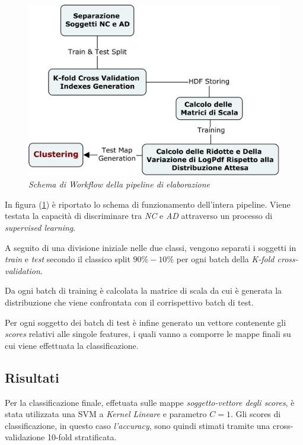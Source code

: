 \documentclass[12pt,openright,a4paper]{article}
\begin{document}
\begin{figure}[!h]
\centering
\includegraphics[scale=0.18]{ADNI-alg}
\caption{\textit{Schema di Workflow della pipeline di elaborazione}}
\label{ADNI-alg}
\end{figure}

In figura (\ref{ADNI-alg}) è riportato lo schema di funzionamento dell'intera pipeline. Viene testata la capacità di discriminare tra \textit{NC} e \textit{AD} attraverso un processo di \textit{supervised learning}.

A seguito di una divisione iniziale nelle due classi, vengono separati i soggetti in \textit{train} e \textit{test} secondo il classico split $90 \%- 10 \%$ per ogni batch della \textit{K-fold cross-validation}.

Da ogni batch di training è calcolata la matrice di scala da cui è generata la distribuzione che viene confrontata con il corrispettivo batch di test.

Per ogni soggetto dei batch di test è infine generato un vettore contenente gli \textit{scores} relativi alle singole features, i quali vanno a comporre le mappe finali su cui viene effettuata la classificazione.

\subsection{Risultati}

Per la classificazione finale, effetuata sulle mappe \textit{soggetto-vettore degli scores},  è stata utilizzata una SVM a \textit{Kernel Lineare} e parametro $C=1$. Gli scores di classificazione, in questo caso \textit{l'accuracy},  sono quindi stimati tramite una cross-validazione 10-fold stratificata. 
\end{document}
